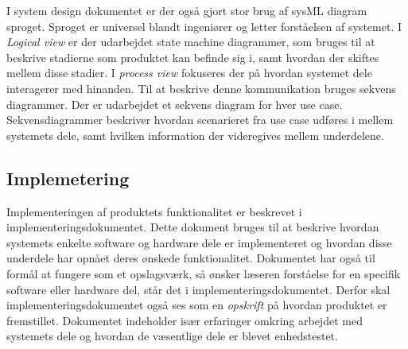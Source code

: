 	I system design dokumentet er der også gjort stor brug af sysML diagram sproget. Sproget er universel blandt ingeniører og letter forståelsen af systemet. I \textit{Logical view} er der udarbejdet state machine diagrammer, som bruges til at beskrive stadierne som produktet kan befinde sig i, samt hvordan der skiftes mellem disse stadier. I \textit{process view} fokuseres der på hvordan systemet dele interagerer med hinanden. Til at beskrive denne kommunikation bruges sekvens diagrammer. Der er udarbejdet et sekvens diagram for hver use case. Sekvensdiagrammer beskriver hvordan scenarieret fra use case udføres i mellem systemets dele, samt hvilken information der videregives mellem underdelene. 
	
	\subsection{Implemetering} \label{title:implementering}
	Implementeringen af produktets funktionalitet er beskrevet i implementeringsdokumentet. Dette dokument bruges til at beskrive hvordan systemets enkelte software og hardware dele er implementeret og hvordan disse underdele har opnået deres ønskede funktionalitet. Dokumentet har også til formål at fungere som et opslagsværk, så ønsker læseren forståelse for en specifik software eller hardware del, står det i implementeringsdokumentet. Derfor skal implementeringsdokumentet også ses som en \textit{opskrift} på hvordan produktet er fremstillet. Dokumentet indeholder især erfaringer omkring arbejdet med systemets dele og hvordan de væsentlige dele er blevet enhedstestet. 

